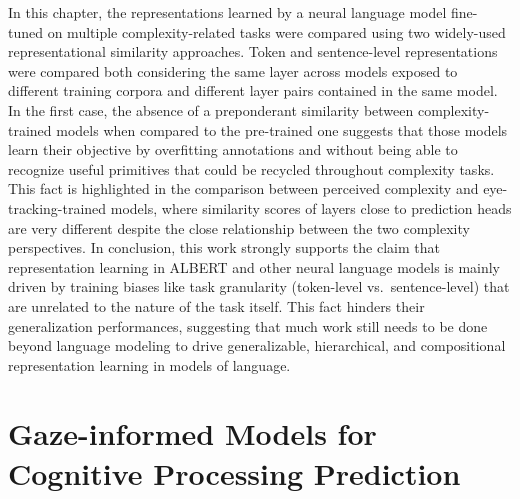 \documentclass[a4paper, nobind]{templates/ociamthesis}
\begin{document}
In this chapter, the representations learned by a neural language model fine-tuned on multiple complexity-related tasks were compared using two widely-used representational similarity approaches. Token and sentence-level representations were compared both considering the same layer across models exposed to different training corpora and different layer pairs contained in the same model. In the first case, the absence of a preponderant similarity between complexity-trained models when compared to the pre-trained one suggests that those models learn their objective by overfitting annotations and without being able to recognize useful primitives that could be recycled throughout complexity tasks. This fact is highlighted in the comparison between perceived complexity and eye-tracking-trained models, where similarity scores of layers close to prediction heads are very different despite the close relationship between the two complexity perspectives. In conclusion, this work strongly supports the claim that representation learning in ALBERT and other neural language models is mainly driven by training biases like task granularity (token-level vs.~sentence-level) that are unrelated to the nature of the task itself. This fact hinders their generalization performances, suggesting that much work still needs to be done beyond language modeling to drive generalizable, hierarchical, and compositional representation learning in models of language.

\hypertarget{chap:ex3}{%
\chapter{\texorpdfstring{\textbf{Gaze-informed Models for Cognitive Processing Prediction}}{Gaze-informed Models for Cognitive Processing Prediction}}\label{chap:ex3}}

\minitoc 

\end{document}
